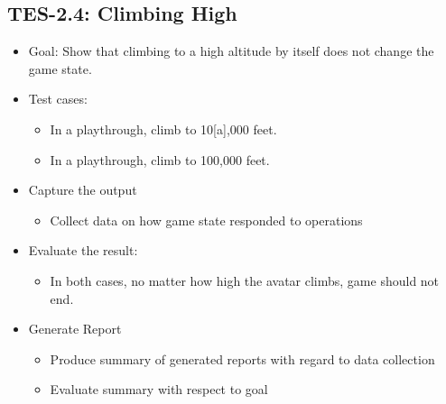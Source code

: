 \subsection{TES-2.4: Climbing High }
\begin{itemize}
\item Goal: Show that climbing to a high altitude by itself does not change
the game state. 
\item Test cases: 

\begin{itemize}
\item In a playthrough, climb to 10{[}a{]},000 feet. 
\item In a playthrough, climb to 100,000 feet. 
\end{itemize}
\item Capture the output 

\begin{itemize}
\item Collect data on how game state responded to operations 
\end{itemize}
\item Evaluate the result: 

\begin{itemize}
\item In both cases, no matter how high the avatar climbs, game should not
end. 
\end{itemize}
\item Generate Report 

\begin{itemize}
\item Produce summary of generated reports with regard to data collection 
\item Evaluate summary with respect to goal
\end{itemize}
\end{itemize}

